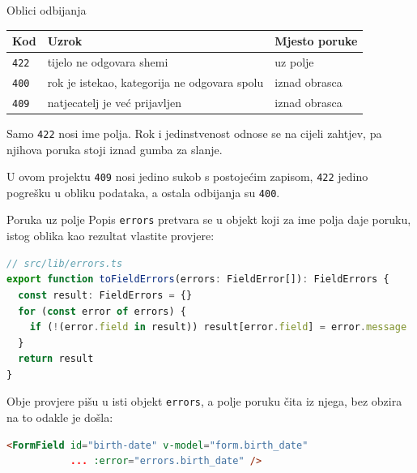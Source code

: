 \begin{frame}{Oblici odbijanja}
\vspace{0.3em}
\begin{center}
{\small
\setlength{\tabcolsep}{6pt}
\renewcommand{\arraystretch}{1.35}
\begin{tabular}{@{}L{1.2cm}L{5.6cm}L{3.0cm}@{}}
  \toprule
  \textbf{Kod} & \textbf{Uzrok} & \textbf{Mjesto poruke} \\
  \midrule
  \texttt{422} & tijelo ne odgovara shemi & uz polje \\
  \texttt{400} & rok je istekao, kategorija ne odgovara spolu & iznad obrasca \\
  \texttt{409} & natjecatelj je već prijavljen & iznad obrasca \\
  \bottomrule
\end{tabular}
}
\end{center}

\vspace{0.6em}
Samo \texttt{422} nosi ime polja. Rok i jedinstvenost odnose se na cijeli zahtjev, pa njihova poruka stoji iznad gumba za slanje.

\vspace{0.4em}
\begin{konvencija}
U ovom projektu \texttt{409} nosi jedino sukob s postojećim zapisom, \texttt{422} jedino pogrešku u obliku podataka, a ostala odbijanja su \texttt{400}.
\end{konvencija}
\end{frame}

\begin{frame}[fragile]{Poruka uz polje}
Popis \texttt{errors} pretvara se u objekt koji za ime polja daje poruku, istog oblika kao rezultat vlastite provjere:

\begin{lstlisting}[language=typescript]
// src/lib/errors.ts
export function toFieldErrors(errors: FieldError[]): FieldErrors {
  const result: FieldErrors = {}
  for (const error of errors) {
    if (!(error.field in result)) result[error.field] = error.message
  }
  return result
}
\end{lstlisting}

\vspace{0.3em}
Obje provjere pišu u isti objekt \texttt{errors}, a polje poruku čita iz njega, bez obzira na to odakle je došla:

\begin{lstlisting}[language=html]
<FormField id="birth-date" v-model="form.birth_date"
           ... :error="errors.birth_date" />
\end{lstlisting}
\end{frame}

